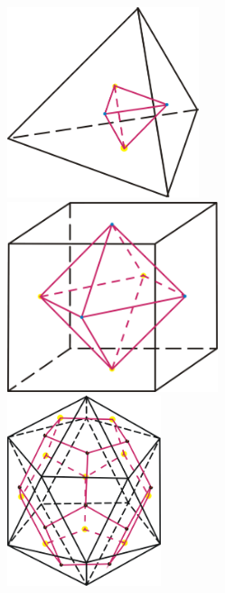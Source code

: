 \documentclass[a4paper,12pt]{scrartcl}
\begin{document}






\newpage
\begin{center}
  \includegraphics[height=210px]{../Grafiken/Duality_Tetra-Tetra.png} \\
 \includegraphics[height=210px]{../Grafiken/Duality_Hexa-Okta.png} \\
 \includegraphics[height=210px]{../Grafiken/Duality_Iko-Dodek.png}
\end{center}
\end{document}

